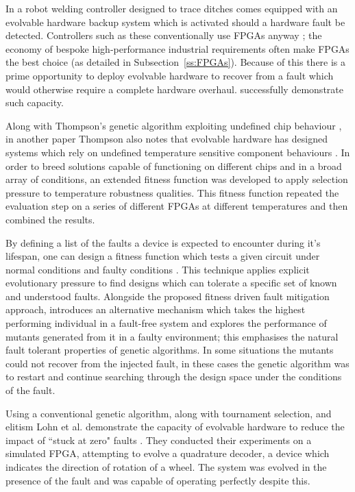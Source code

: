 In \cite{10.1007/3-540-61093-6_6} a robot welding controller designed to trace
ditches comes equipped with an evolvable hardware backup system which is activated
should a hardware fault be detected. Controllers such as these conventionally use
FPGAs anyway \cite{4267891}; the economy of bespoke high-performance industrial requirements
often make FPGAs the best choice (as detailed in Subsection~\ref{ss:FPGAs}). Because of
this there is a prime opportunity to deploy evolvable hardware to recover from
a fault which would otherwise require a complete hardware overhaul. \cite{10.1007/3-540-61093-6_6}
successfully demonstrate such capacity.

Along with Thompson's genetic algorithm exploiting undefined chip behaviour
\cite{10.1007/3-540-63173-9_61}, in another paper Thompson also notes that evolvable
hardware has designed
systems which rely on undefined temperature sensitive component behaviours
\cite{Thompson:1998:ADR:645508.656773}. In order to breed solutions capable
of functioning on different chips and in a broad array of conditions, an extended
fitness function
was developed to apply selection pressure to temperature robustness qualities.
This fitness function repeated the evaluation step on a series of different FPGAs
at different temperatures and then combined the results.

By defining a list of the faults a device is expected to encounter during it's
lifespan, one can design a fitness function which tests a given circuit under
normal conditions and faulty conditions \cite{651463}\cite{Keymeulen2000}. This technique applies explicit
evolutionary pressure to find designs which can tolerate a specific set of
known and understood faults. Alongside the proposed fitness driven fault mitigation
approach, \cite{Keymeulen2000} introduces an alternative mechanism which takes the
highest performing individual in a fault-free system and explores the performance
of mutants generated from it in a faulty environment; this emphasises the natural
fault tolerant properties of genetic algorithms. In some situations the mutants
could not recover from the injected fault, in these cases the genetic algorithm
was to restart and continue searching through the design space under the conditions
of the fault.

Using a conventional genetic algorithm, along with tournament selection, and elitism
Lohn et al. demonstrate the capacity
of evolvable hardware to reduce the impact of ``stuck at zero" faults \cite{10.1007/3-540-36553-2_5}. They
conducted their experiments on a simulated FPGA, attempting to evolve a quadrature
decoder, a device which indicates
the direction of rotation of a wheel. The system was evolved in the presence
of the fault and was capable of operating perfectly despite this.

